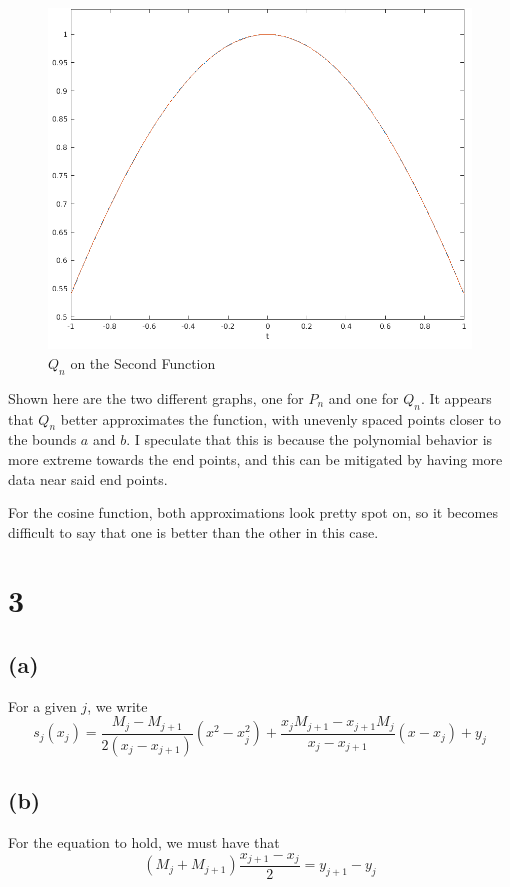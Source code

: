 \documentclass{article}
\begin{document}
\begin{figure}
\caption{$Q_n$ on the Second Function}
\centering
\includegraphics[scale=.4]{hw_7_plot_f2}
\end{figure}


Shown here are the two different graphs, one for $P_n$ and one for $Q_n$. It appears that $Q_n$ better approximates the function, with unevenly spaced points closer to the bounds $a$ and $b$. I speculate that this is because the polynomial behavior is more extreme towards the end points, and this can be mitigated by having more data near said end points.

For the cosine function, both approximations look pretty spot on, so it becomes difficult to say that one is better than the other in this case.

\section*{3}
\subsection*{(a)}
For a given $j$, we write 
\[s_j (x_j) = \frac{M_j - M_{j+1}}{2(x_j-x_{j+1})}(x^2-x_j^2) + \frac{x_jM_{j+1}-x_{j+1}M_j}{x_j-x_{j+1}}(x-x_j) + y_j \]
\subsection*{(b)}
For the equation to hold, we must have that
\[(M_j + M_{j+1})\frac{x_{j+1}-x_j}{2} = y_{j+1}-y_j\]
\end{document}
